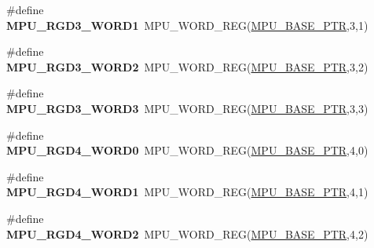 \begin{DoxyCompactItemize}
\item 
\hypertarget{group___m_p_u___register___accessor___macros_ga7d8fc007799790e7da1f87f5b03cc455}{}\#define {\bfseries M\+P\+U\+\_\+\+R\+G\+D3\+\_\+\+W\+O\+R\+D1}~M\+P\+U\+\_\+\+W\+O\+R\+D\+\_\+\+R\+E\+G(\hyperlink{group___m_p_u___peripheral_gae2d60f80178d84225d77e5f0214d1f1d}{M\+P\+U\+\_\+\+B\+A\+S\+E\+\_\+\+P\+T\+R},3,1)\label{group___m_p_u___register___accessor___macros_ga7d8fc007799790e7da1f87f5b03cc455}

\item 
\hypertarget{group___m_p_u___register___accessor___macros_ga107ae842371d3536fbc15ca2f261bbe4}{}\#define {\bfseries M\+P\+U\+\_\+\+R\+G\+D3\+\_\+\+W\+O\+R\+D2}~M\+P\+U\+\_\+\+W\+O\+R\+D\+\_\+\+R\+E\+G(\hyperlink{group___m_p_u___peripheral_gae2d60f80178d84225d77e5f0214d1f1d}{M\+P\+U\+\_\+\+B\+A\+S\+E\+\_\+\+P\+T\+R},3,2)\label{group___m_p_u___register___accessor___macros_ga107ae842371d3536fbc15ca2f261bbe4}

\item 
\hypertarget{group___m_p_u___register___accessor___macros_gad2ea52e05952feac126e5fbcc01fd6ef}{}\#define {\bfseries M\+P\+U\+\_\+\+R\+G\+D3\+\_\+\+W\+O\+R\+D3}~M\+P\+U\+\_\+\+W\+O\+R\+D\+\_\+\+R\+E\+G(\hyperlink{group___m_p_u___peripheral_gae2d60f80178d84225d77e5f0214d1f1d}{M\+P\+U\+\_\+\+B\+A\+S\+E\+\_\+\+P\+T\+R},3,3)\label{group___m_p_u___register___accessor___macros_gad2ea52e05952feac126e5fbcc01fd6ef}

\item 
\hypertarget{group___m_p_u___register___accessor___macros_ga919006df74fef810e4c5e7f2a7b028fd}{}\#define {\bfseries M\+P\+U\+\_\+\+R\+G\+D4\+\_\+\+W\+O\+R\+D0}~M\+P\+U\+\_\+\+W\+O\+R\+D\+\_\+\+R\+E\+G(\hyperlink{group___m_p_u___peripheral_gae2d60f80178d84225d77e5f0214d1f1d}{M\+P\+U\+\_\+\+B\+A\+S\+E\+\_\+\+P\+T\+R},4,0)\label{group___m_p_u___register___accessor___macros_ga919006df74fef810e4c5e7f2a7b028fd}

\item 
\hypertarget{group___m_p_u___register___accessor___macros_ga94e8cab14c6b4b2b981748d679dce4c8}{}\#define {\bfseries M\+P\+U\+\_\+\+R\+G\+D4\+\_\+\+W\+O\+R\+D1}~M\+P\+U\+\_\+\+W\+O\+R\+D\+\_\+\+R\+E\+G(\hyperlink{group___m_p_u___peripheral_gae2d60f80178d84225d77e5f0214d1f1d}{M\+P\+U\+\_\+\+B\+A\+S\+E\+\_\+\+P\+T\+R},4,1)\label{group___m_p_u___register___accessor___macros_ga94e8cab14c6b4b2b981748d679dce4c8}

\item 
\hypertarget{group___m_p_u___register___accessor___macros_ga2dacfad14acb78cf23afcc1573eeb457}{}\#define {\bfseries M\+P\+U\+\_\+\+R\+G\+D4\+\_\+\+W\+O\+R\+D2}~M\+P\+U\+\_\+\+W\+O\+R\+D\+\_\+\+R\+E\+G(\hyperlink{group___m_p_u___peripheral_gae2d60f80178d84225d77e5f0214d1f1d}{M\+P\+U\+\_\+\+B\+A\+S\+E\+\_\+\+P\+T\+R},4,2)\label{group___m_p_u___register___accessor___macros_ga2dacfad14acb78cf23afcc1573eeb457}


\end{DoxyCompactItemize}
